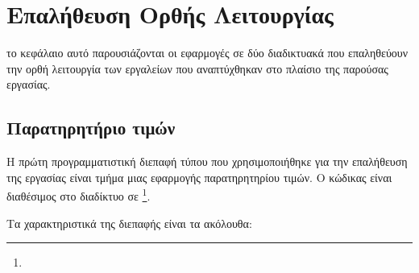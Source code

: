 \chapter{Επαλήθευση Ορθής Λειτουργίας}
το κεφάλαιο αυτό παρουσιάζονται οι εφαρμογές σε δύο διαδικτυακά  
που επαληθεύουν την ορθή λειτουργία των εργαλείων που αναπτύχθηκαν στο πλαίσιο της παρούσας εργασίας.

\section{Παρατηρητήριο τιμών}
Η πρώτη προγραμματιστική διεπαφή τύπου  που χρησιμοποιήθηκε για την επαλήθευση της εργασίας 
είναι τμήμα μιας εφαρμογής παρατηρητηρίου τιμών.
Ο κώδικας είναι διαθέσιμος στο διαδίκτυο σε \footnote{}.

Τα χαρακτηριστικά της διεπαφής είναι τα ακόλουθα:

